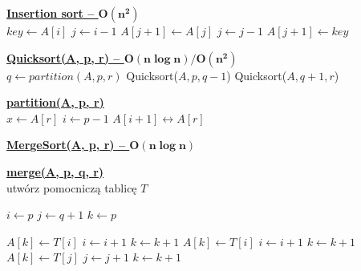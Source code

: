 \documentclass[a4paper,8pt]{article}
\DeclarePairedDelimiter\floor{\lfloor}{\rfloor}
\begin{document}
\begin{multicols}{3}


{\SetAlgoNoLine
  \begin{algorithm*}[H] \small{
  \underline{\textbf{Insertion sort -- $\boldsymbol{O(n^2)}$}}\\
     {
      $key \leftarrow A[i]$\;
      $j \leftarrow i-1$\;
       {
        $A[j+1] \leftarrow A[j]$\;
        $j \leftarrow j-1$\;
      }
      $A[j+1] \leftarrow key$\;
    }
  }\end{algorithm*}
}

{\SetAlgoNoLine
  \begin{algorithm*}[H] \small{
    \underline{\textbf{Quicksort(A, p, r)  -- $\boldsymbol{O(n\log{n})/O(n^2)}$}}\\
     {
      $q \leftarrow partition(A, p, r)$\;
      Quicksort($A, p, q-1$)\;
      Quicksort($A, q+1, r$)\;
    }
  }\end{algorithm*}
}

{\SetAlgoNoLine
  \begin{algorithm*}[H] \small{
    \underline{\textbf{partition(A, p, r)}}\\
    $x \leftarrow A[r]$\;
    $i \leftarrow p-1$\;
    $A[i+1] \leftrightarrow A[r]$\;
    \;
  }\end{algorithm*}
}

{\SetAlgoNoLine
  \begin{algorithm*}[H] \small{
  \underline{\textbf{MergeSort(A, p, r) -- $\boldsymbol{O(n\log{n})}$}}\\
  }\end{algorithm*}
}

{\SetAlgoNoLine
  \begin{algorithm*}[H] \small{
    \underline{\textbf{merge(A, p, q, r)}}\\
    utwórz pomocniczą tablicę $T$\;

    $i \leftarrow p$\;
    $j \leftarrow q+1$\;
    $k \leftarrow p$\;

     {
       {
        $A[k] \leftarrow T[i]$\;
        $i \leftarrow i+1$\;
      }
      $k \leftarrow k+1$\;
    }
     {
      $A[k] \leftarrow T[i]$\;
      $i \leftarrow i+1$\;
      $k \leftarrow k+1$\;
    }
     {
      $A[k] \leftarrow T[j]$\;
      $j \leftarrow j+1$\;
      $k \leftarrow k+1$\;
    }

  }\end{algorithm*}
}


\end{multicols}



\end{document}

